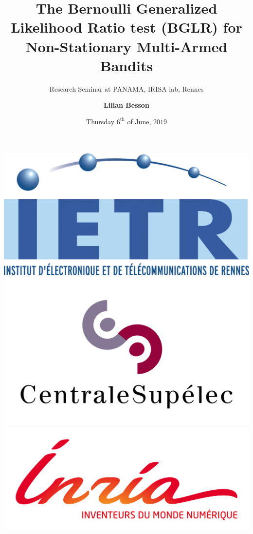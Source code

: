 \documentclass[11pt,english,ignorenonframetext,]{beamer}
\title[BGLR test and Non-Stationary MAB]{The Bernoulli Generalized Likelihood Ratio test (BGLR) for Non-Stationary Multi-Armed Bandits}
\subtitle{Research Seminar at PANAMA, IRISA lab, Rennes}
\author[Lilian Besson]{\Large \textbf{Lilian Besson}}
\institute[]{{\large
  PhD Student}{\newline
  \newline SCEE team, IETR laboratory, CentraleSupélec in Rennes
  \newline \& SequeL team, CRIStAL laboratory, Inria in Lille}}
\date{Thursday $6^{\text{th}}$ of June, $2019$}
\begin{document}
\justifying

\begin{frame}[plain]
  \titlepage

  \begin{center}
    \includegraphics[height=0.15\textheight]{../common/LogoIETR.png}
    \includegraphics[height=0.17\textheight]{../common/LogoCS.png}
    \includegraphics[height=0.15\textheight]{../common/LogoInria.jpg}
  \end{center}

\end{frame}
\end{document}
